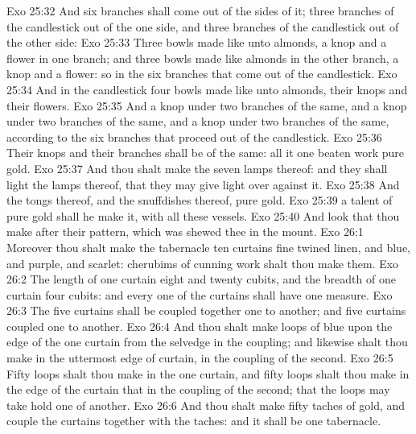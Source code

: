 \vs Exo 25:32 And six branches shall come out of the sides of it; three branches of the candlestick out of the one side, and three branches of the candlestick out of the other side:
\vs Exo 25:33 Three bowls made like unto almonds,  a knop and a flower in one branch; and three bowls made like almonds in the other branch,  a knop and a flower: so in the six branches that come out of the candlestick.
\vs Exo 25:34 And in the candlestick  four bowls made like unto almonds,  their knops and their flowers.
\vs Exo 25:35 And  a knop under two branches of the same, and a knop under two branches of the same, and a knop under two branches of the same, according to the six branches that proceed out of the candlestick.
\vs Exo 25:36 Their knops and their branches shall be of the same: all it  one beaten work  pure gold.
\vs Exo 25:37 And thou shalt make the seven lamps thereof: and they shall light the lamps thereof, that they may give light over against it.
\vs Exo 25:38 And the tongs thereof, and the snuffdishes thereof,  pure gold.
\vs Exo 25:39  a talent of pure gold shall he make it, with all these vessels.
\vs Exo 25:40 And look that thou make  after their pattern, which was shewed thee in the mount.
\vs Exo 26:1 Moreover thou shalt make the tabernacle  ten curtains  fine twined linen, and blue, and purple, and scarlet:  cherubims of cunning work shalt thou make them.
\vs Exo 26:2 The length of one curtain  eight and twenty cubits, and the breadth of one curtain four cubits: and every one of the curtains shall have one measure.
\vs Exo 26:3 The five curtains shall be coupled together one to another; and  five curtains  coupled one to another.
\vs Exo 26:4 And thou shalt make loops of blue upon the edge of the one curtain from the selvedge in the coupling; and likewise shalt thou make in the uttermost edge of  curtain, in the coupling of the second.
\vs Exo 26:5 Fifty loops shalt thou make in the one curtain, and fifty loops shalt thou make in the edge of the curtain that  in the coupling of the second; that the loops may take hold one of another.
\vs Exo 26:6 And thou shalt make fifty taches of gold, and couple the curtains together with the taches: and it shall be one tabernacle.
